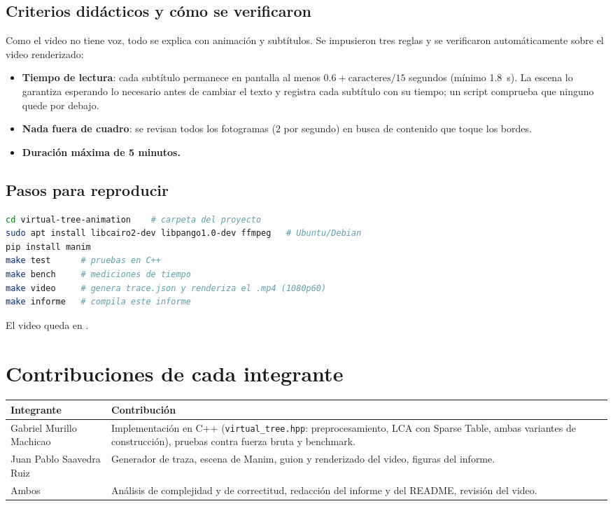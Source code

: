 \documentclass[11pt,a4paper]{article}
\theoremstyle{plain}
\newcommand{\IntegranteA}{Gabriel Murillo Machicao}
\newcommand{\IntegranteB}{Juan Pablo Saavedra Ruiz}
\begin{document}
\subsection*{Criterios didácticos y cómo se verificaron}
Como el video no tiene voz, todo se explica con animación y subtítulos. Se impusieron tres
reglas y se verificaron automáticamente sobre el video renderizado:
\begin{itemize}
  \item \textbf{Tiempo de lectura}: cada subtítulo permanece en pantalla al menos
        $0.6 + \text{caracteres}/15$ segundos (mínimo 1.8~s). La escena lo garantiza esperando
        lo necesario antes de cambiar el texto y registra cada subtítulo con su tiempo;
        un script comprueba que ninguno quede por debajo.
  \item \textbf{Nada fuera de cuadro}: se revisan todos los fotogramas (2 por segundo) en
        busca de contenido que toque los bordes.
  \item \textbf{Duración máxima de 5 minutos.}
\end{itemize}

\subsection*{Pasos para reproducir}
\begin{lstlisting}[language=bash]
cd virtual-tree-animation    # carpeta del proyecto
sudo apt install libcairo2-dev libpango1.0-dev ffmpeg   # Ubuntu/Debian
pip install manim
make test      # pruebas en C++
make bench     # mediciones de tiempo
make video     # genera trace.json y renderiza el .mp4 (1080p60)
make informe   # compila este informe
\end{lstlisting}
El video queda en
.

\section{Contribuciones de cada integrante}

\begin{table}[H]
  \centering
  \begin{tabular}{@{}>{\raggedright\arraybackslash}p{4.4cm}p{10.1cm}@{}}
    \toprule
    \textbf{Integrante} & \textbf{Contribución} \\
    \midrule
    \IntegranteA & Implementación en C++ (\texttt{virtual\_tree.hpp}: preprocesamiento, LCA
      con Sparse Table, ambas variantes de construcción), pruebas contra fuerza bruta y
      benchmark. \\
    \IntegranteB & Generador de traza, escena de Manim, guion y renderizado del video,
      figuras del informe. \\
    Ambos & Análisis de complejidad y de correctitud, redacción del informe y del README,
      revisión del video. \\
    \bottomrule
  \end{tabular}
\end{table}
\end{document}
